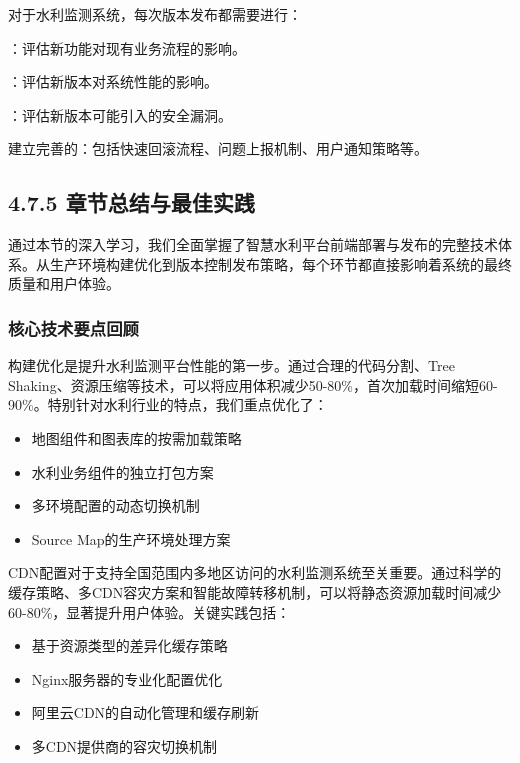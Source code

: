 对于水利监测系统，每次版本发布都需要进行：

：评估新功能对现有业务流程的影响。

：评估新版本对系统性能的影响。

：评估新版本可能引入的安全漏洞。

建立完善的：包括快速回滚流程、问题上报机制、用户通知策略等。

\hypertarget{ux7ae0ux8282ux603bux7ed3ux4e0eux6700ux4f73ux5b9eux8df5}{%
\subsection{4.7.5 章节总结与最佳实践}\label{ux7ae0ux8282ux603bux7ed3ux4e0eux6700ux4f73ux5b9eux8df5}}

通过本节的深入学习，我们全面掌握了智慧水利平台前端部署与发布的完整技术体系。从生产环境构建优化到版本控制发布策略，每个环节都直接影响着系统的最终质量和用户体验。

\hypertarget{ux6838ux5fc3ux6280ux672fux8981ux70b9ux56deux987e}{%
\subsubsection{核心技术要点回顾}\label{ux6838ux5fc3ux6280ux672fux8981ux70b9ux56deux987e}}


构建优化是提升水利监测平台性能的第一步。通过合理的代码分割、Tree Shaking、资源压缩等技术，可以将应用体积减少50-80\%，首次加载时间缩短60-90\%。特别针对水利行业的特点，我们重点优化了：

\begin{itemize}
\tightlist
\item
  地图组件和图表库的按需加载策略
\item
  水利业务组件的独立打包方案
\item
  多环境配置的动态切换机制
\item
  Source Map的生产环境处理方案
\end{itemize}


CDN配置对于支持全国范围内多地区访问的水利监测系统至关重要。通过科学的缓存策略、多CDN容灾方案和智能故障转移机制，可以将静态资源加载时间减少60-80\%，显著提升用户体验。关键实践包括：

\begin{itemize}
\tightlist
\item
  基于资源类型的差异化缓存策略
\item
  Nginx服务器的专业化配置优化
\item
  阿里云CDN的自动化管理和缓存刷新
\item
  多CDN提供商的容灾切换机制
\end{itemize}

